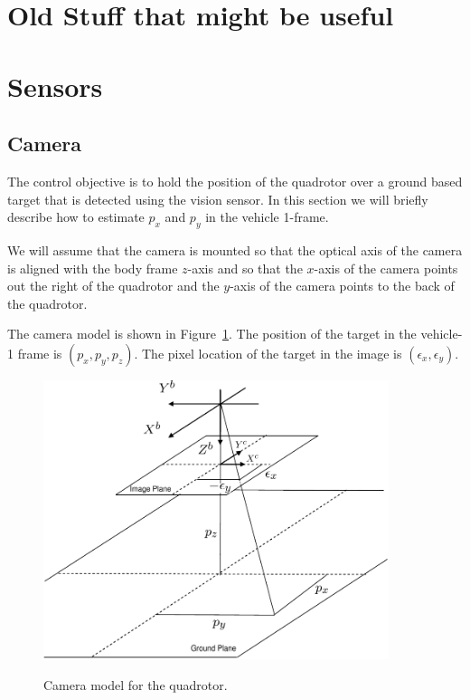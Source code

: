 {\color{red}
\section{Old Stuff that might be useful}

\section{Sensors}

\subsection{Camera}

The control objective is to hold the position of the quadrotor over
a ground based target that is detected using the vision sensor.  In
this section we will briefly describe how to estimate $p_x$ and
$p_y$ in the vehicle 1-frame.

We will assume that the camera is mounted so that the optical axis
of the camera is aligned with the body frame $z$-axis and so that
the $x$-axis of the camera points out the right of the quadrotor and
the $y$-axis of the camera points to the back of the quadrotor.

The camera model is shown in Figure~\ref{fig:camera_model}.  The
position of the target in the vehicle-1 frame is $(p_x, p_y, p_z)$.
The pixel location of the target in the image is $(\epsilon_x,
\epsilon_y)$.
\begin{figure}[hhhhtb]
  \centering
  \includegraphics[width=0.9\textwidth]{chap11_attitude_estimation/figures/camera_model}\\
  \caption{Camera model for the quadrotor.}%
  \label{fig:camera_model}
\end{figure}


}
